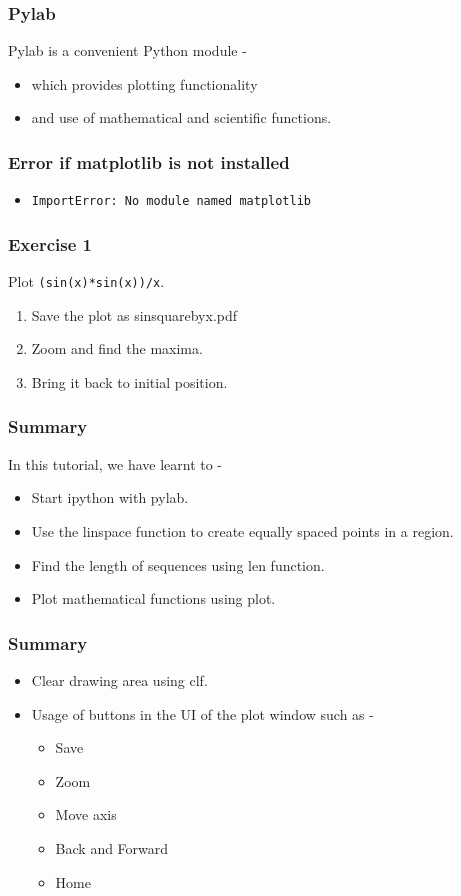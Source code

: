 \documentclass[17pt]{beamer}
\begin{document}
\begin{frame}
\frametitle{Pylab}
Pylab is a convenient Python module -\pause
\begin{itemize}
\item which provides plotting functionality\pause
\item and use of mathematical and scientific functions.
\end{itemize}
\end{frame}
\begin{frame}
\frametitle{Error if matplotlib is not installed}
\label{sec-3}
\begin{itemize}
\item \texttt{ImportError: No module named matplotlib}\\
\label{sec-3_1}%
\end{itemize} %
\end{frame}
\begin{frame}
\frametitle{Exercise 1}
\label{sec-5}
Plot \texttt{(sin(x)*sin(x))/x}.
\begin{enumerate}
\item Save the plot as sinsquarebyx.pdf\pause
\item Zoom and find the maxima.\pause
\item Bring it back to initial position.
\end{enumerate}
\end{frame}
\begin{frame}
\frametitle{Summary}
\label{sec-6.1}
In this tutorial, we have learnt to -\pause
\begin{itemize}
\item Start ipython with pylab.\pause
\item Use the linspace function to create equally spaced points in a region.\pause
\item Find the length of sequences using len function.\pause
\item Plot mathematical functions using plot.
\end{itemize}
\end{frame}
\begin{frame}
\frametitle{Summary}
\label{sec-6.2}
\begin{itemize}
\item Clear drawing area using clf.\pause
\item Usage of buttons in the UI of the plot window such as -\pause
\begin{itemize}
\item Save
\item Zoom
\item Move axis
\item Back and Forward
\item Home
\end{itemize}
\end{itemize}
\end{frame}
\end{document}
